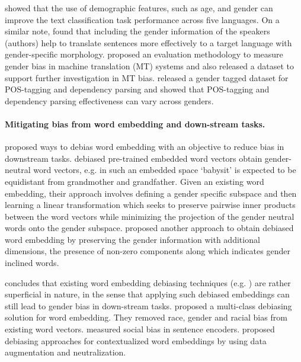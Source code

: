 \documentclass[letterpaper]{article}
\begin{document}
\citet{hovy-2015-demographic} showed that the use of demographic features, such as age, and gender can improve the text classification task performance across five languages. On a similar note, \citet{vanmassenhove-etal} found that including the gender information of the speakers (authors) help to translate sentences more effectively
to a target language with gender-specific morphology.
\citet{stanovsky-etal-2019} proposed an evaluation methodology to measure gender bias in machine translation (MT) systems and also released a dataset to support further investigation in MT bias.
\citet{garimella-etal-2019} released a gender tagged dataset for POS-tagging and dependency parsing and showed that POS-tagging and dependency parsing effectiveness can vary across genders.


\paragraph{Mitigating bias from word embedding and down-stream tasks.}

\citet{prost-etal-2019} proposed ways to debias word embedding with an objective to reduce bias in downstream tasks.
\citet{Bolukbasi:2016} debiased pre-trained embedded word vectors
obtain gender-neutral word vectors, e.g. in such an embedded space `babysit' is expected to be equidistant from grandmother and grandfather.
Given an existing word embedding, their approach involves
defining a gender specific subspace and then
learning a linear transformation which seeks to preserve pairwise inner products between the word vectors while minimizing the projection of the gender neutral words onto the gender subspace.
\citet{zhao-etal-2018} proposed another approach to obtain debiased  word embedding by preserving the gender information with additional dimensions, the presence of non-zero components along which indicates gender inclined words.

\citet{gonen-goldberg-2019} concludes that existing word embedding debiasing techniques (e.g. \cite{Bolukbasi:2016})
are rather superficial in nature, in the sense that applying such debiased embeddings can still lead to gender bias in down-stream tasks. \citet{manzini-etal-2019} proposed a multi-class debiasing solution for word embedding. They removed race, gender and racial bias from existing word vectors.
\citet{may-etal-2019-measuring} measured social bias in sentence encoders. \citet{zhao-etal-2019} proposed debiasing approaches for contextualized word embeddings by using data augmentation and neutralization.
\end{document}
